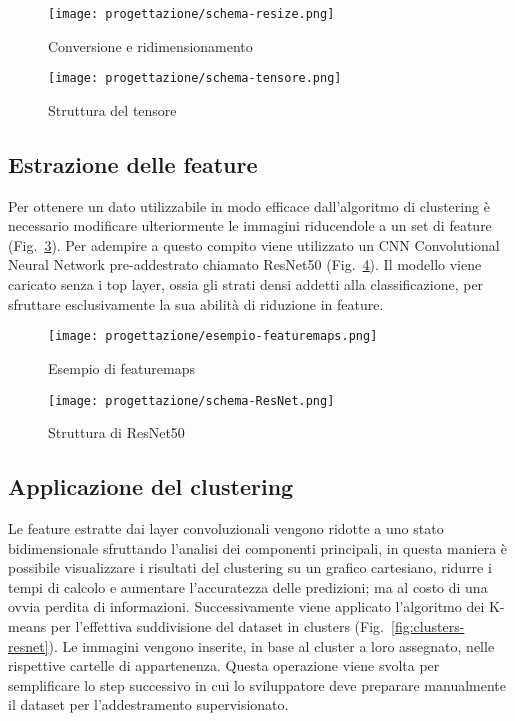 \begin{figure}[!h] 
  \centering 
  \texttt{[image: progettazione/schema-resize.png]} 
  \caption{Conversione e ridimensionamento}
  \label{fig:schema-resize}
\end{figure}

\begin{figure}[!h] 
  \centering 
  \texttt{[image: progettazione/schema-tensore.png]} 
  \caption{Struttura del tensore}
  \label{fig:schema-tensore}
\end{figure}

\newpage


\subsection{Estrazione delle feature}
Per ottenere un dato utilizzabile in modo efficace dall'algoritmo di clustering è necessario modificare ulteriormente le immagini riducendole a un set di feature (Fig.~\ref{fig:featuremaps}).
Per adempire a questo compito viene utilizzato un CNN Convolutional Neural Network pre-addestrato chiamato ResNet50 (Fig.~\ref{fig:schema-resnet}).
Il modello viene caricato senza i top layer, ossia gli strati densi addetti alla classificazione, per sfruttare esclusivamente la sua abilità di riduzione in feature.

\begin{figure}[!h] 
  \centering 
  \texttt{[image: progettazione/esempio-featuremaps.png]} 
  \caption{Esempio di featuremaps}
  \label{fig:featuremaps}
\end{figure}

\begin{figure}[!h] 
  \centering 
  \texttt{[image: progettazione/schema-ResNet.png]} 
  \caption{Struttura di ResNet50}
  \label{fig:schema-resnet}
\end{figure}



\subsection{Applicazione del clustering}
Le feature estratte dai layer convoluzionali vengono ridotte a uno stato bidimensionale sfruttando l'analisi dei componenti principali, in questa maniera è possibile visualizzare i risultati del clustering su un grafico cartesiano, ridurre i tempi di calcolo e aumentare l'accuratezza delle predizioni; ma al costo di una ovvia perdita di informazioni.
Successivamente viene applicato l'algoritmo dei K-means per l'effettiva suddivisione del dataset in clusters (Fig.~\ref{fig:clusters-resnet}).
Le immagini vengono inserite, in base al cluster a loro assegnato, nelle rispettive cartelle di appartenenza.
Questa operazione viene svolta per semplificare lo step successivo in cui lo sviluppatore deve preparare manualmente il dataset per l'addestramento supervisionato.

